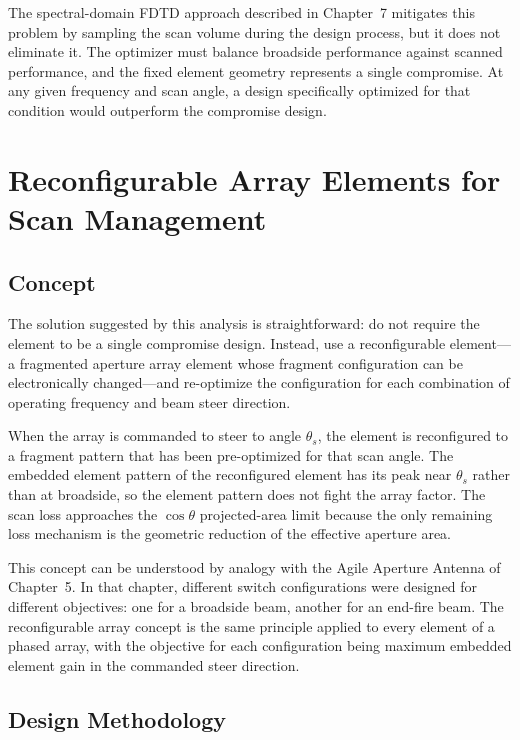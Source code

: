 The spectral-domain FDTD approach described in Chapter~7 mitigates this problem by sampling the scan volume during the design process, but it does not eliminate it.  The optimizer must balance broadside performance against scanned performance, and the fixed element geometry represents a single compromise.  At any given frequency and scan angle, a design specifically optimized for that condition would outperform the compromise design.

\section{Reconfigurable Array Elements for Scan Management}

\subsection{Concept}

The solution suggested by this analysis is straightforward: do not require the element to be a single compromise design.  Instead, use a reconfigurable element---a fragmented aperture array element whose fragment configuration can be electronically changed---and re-optimize the configuration for each combination of operating frequency and beam steer direction.

When the array is commanded to steer to angle $\theta_s$, the element is reconfigured to a fragment pattern that has been pre-optimized for that scan angle.  The embedded element pattern of the reconfigured element has its peak near $\theta_s$ rather than at broadside, so the element pattern does not fight the array factor.  The scan loss approaches the $\cos\theta$ projected-area limit because the only remaining loss mechanism is the geometric reduction of the effective aperture area.

This concept can be understood by analogy with the Agile Aperture Antenna of Chapter~5.  In that chapter, different switch configurations were designed for different objectives: one for a broadside beam, another for an end-fire beam.  The reconfigurable array concept is the same principle applied to every element of a phased array, with the objective for each configuration being maximum embedded element gain in the commanded steer direction.

\subsection{Design Methodology}

